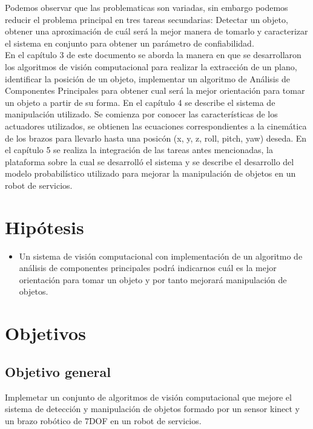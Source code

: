 \documentclass[a4paper, openright, 12pt]{report}
\begin{document}
		Podemos observar que las problematicas son variadas, sin embargo podemos reducir el problema principal en tres tareas secundarias: Detectar un objeto, obtener una aproximación de cuál será la mejor manera de tomarlo y caracterizar el sistema en conjunto para obtener un parámetro de confiabilidad.\\

		En el capítulo 3 de este documento se aborda la manera en que se desarrollaron los algoritmos de visión computacional para realizar la extracción de un plano, identificar la posición de un objeto, implementar un algoritmo de Análisis de Componentes Principales para obtener cual será la mejor orientación para tomar un objeto a partir de su forma. En el capítulo 4 se describe el sistema de manipulación utilizado. Se comienza por conocer las características de los actuadores utilizados, se obtienen las ecuaciones correspondientes a la cinemática de los brazos para llevarlo hasta una posicón (x, y, z, roll, pitch, yaw) deseda. En el capítulo 5 se realiza la integración de las tareas antes mencionadas, la plataforma sobre la cual se desarrolló el sistema y se describe el desarrollo del modelo probabilístico utilizado para mejorar la manipulación de objetos en un robot de servicios.\\


	\section{Hipótesis}
		\begin{itemize}

			\item Un sistema de visión computacional con implementación de un algoritmo de análisis de componentes principales podrá indicarnos cuál es la mejor orientación para tomar un objeto y por tanto mejorará manipulación de objetos.\\

		\end{itemize}

	\section{Objetivos}
		\subsection*{Objetivo general}
			Implemetar un conjunto de algoritmos de visión computacional que mejore el sistema de detección y manipulación de objetos formado por un sensor kinect y un brazo robótico de 7DOF en un robot de servicios.
\end{document}
